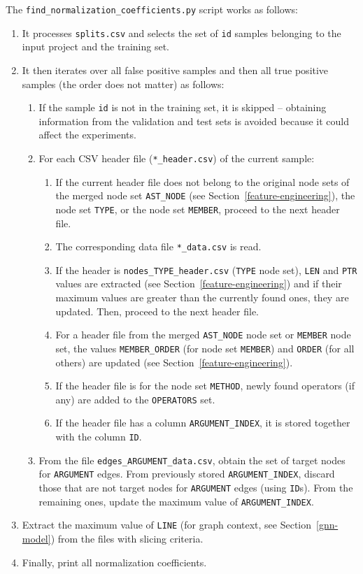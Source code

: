 The \texttt{find\_normalization\_coefficients.py} script works as follows:
\begin{enumerate}
    \item It processes \texttt{splits.csv} and selects the set of \texttt{id} samples belonging to the input project and the training set.
    \item It then iterates over all false positive samples and then all true positive samples (the order does not matter) as follows:
    \begin{enumerate}
        \item If the sample \texttt{id} is not in the training set, it is skipped -- obtaining information from the validation and test sets is avoided because it could affect the experiments.
        \item For each CSV header file (\texttt{*\_header.csv}) of the current sample:
        \begin{enumerate}
            \item If the current header file does not belong to the original node sets of the merged node set \texttt{AST\_NODE} (see Section~\ref{feature-engineering}), the node set \texttt{TYPE}, or the node set \texttt{MEMBER}, proceed to the next header file.
            \item The corresponding data file \texttt{*\_data.csv} is read.
            \item If the header is \texttt{nodes\_TYPE\_header.csv} (\texttt{TYPE} node set), \texttt{LEN} and \texttt{PTR} values are extracted (see Section~\ref{feature-engineering}) and if their maximum values are greater than the currently found ones, they are updated. Then, proceed to the next header file.
            \item For a header file from the merged \texttt{AST\_NODE} node set or \texttt{MEMBER} node set, the values \texttt{MEMBER\_ORDER} (for node set \texttt{MEMBER}) and \texttt{ORDER} (for all others) are updated (see Section~\ref{feature-engineering}).
            \item If the header file is for the node set \texttt{METHOD}, newly found operators (if any) are added to the \texttt{OPERATORS} set.
            \item If the header file has a column \texttt{ARGUMENT\_INDEX}, it is stored together with the column \texttt{ID}.
        \end{enumerate}
        \item From the file \texttt{edges\_ARGUMENT\_data.csv}, obtain the set of target nodes for \texttt{ARGUMENT} edges. From previously stored \texttt{ARGUMENT\_INDEX}, discard those that are not target nodes for \texttt{ARGUMENT} edges (using \texttt{ID}s). From the remaining ones, update the maximum value of \texttt{ARGUMENT\_INDEX}.
    \end{enumerate}
    \item Extract the maximum value of \texttt{LINE} (for graph context, see Section~\ref{gnn-model}) from the files with slicing criteria.
    \item Finally, print all normalization coefficients.
\end{enumerate}

